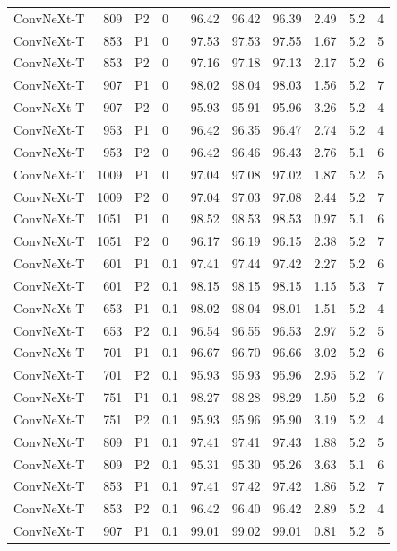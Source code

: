 {\begin{longtable}{lrllrrrrrr}
ConvNeXt-T & 809 & P2 & 0 & 96.42 & 96.42 & 96.39 & 2.49 & 5.2 & 4 \\
ConvNeXt-T & 853 & P1 & 0 & 97.53 & 97.53 & 97.55 & 1.67 & 5.2 & 5 \\
ConvNeXt-T & 853 & P2 & 0 & 97.16 & 97.18 & 97.13 & 2.17 & 5.2 & 6 \\
ConvNeXt-T & 907 & P1 & 0 & 98.02 & 98.04 & 98.03 & 1.56 & 5.2 & 7 \\
ConvNeXt-T & 907 & P2 & 0 & 95.93 & 95.91 & 95.96 & 3.26 & 5.2 & 4 \\
ConvNeXt-T & 953 & P1 & 0 & 96.42 & 96.35 & 96.47 & 2.74 & 5.2 & 4 \\
ConvNeXt-T & 953 & P2 & 0 & 96.42 & 96.46 & 96.43 & 2.76 & 5.1 & 6 \\
ConvNeXt-T & 1009 & P1 & 0 & 97.04 & 97.08 & 97.02 & 1.87 & 5.2 & 5 \\
ConvNeXt-T & 1009 & P2 & 0 & 97.04 & 97.03 & 97.08 & 2.44 & 5.2 & 7 \\
ConvNeXt-T & 1051 & P1 & 0 & 98.52 & 98.53 & 98.53 & 0.97 & 5.1 & 6 \\
ConvNeXt-T & 1051 & P2 & 0 & 96.17 & 96.19 & 96.15 & 2.38 & 5.2 & 7 \\
ConvNeXt-T & 601 & P1 & 0.1 & 97.41 & 97.44 & 97.42 & 2.27 & 5.2 & 6 \\
ConvNeXt-T & 601 & P2 & 0.1 & 98.15 & 98.15 & 98.15 & 1.15 & 5.3 & 7 \\
ConvNeXt-T & 653 & P1 & 0.1 & 98.02 & 98.04 & 98.01 & 1.51 & 5.2 & 4 \\
ConvNeXt-T & 653 & P2 & 0.1 & 96.54 & 96.55 & 96.53 & 2.97 & 5.2 & 5 \\
ConvNeXt-T & 701 & P1 & 0.1 & 96.67 & 96.70 & 96.66 & 3.02 & 5.2 & 6 \\
ConvNeXt-T & 701 & P2 & 0.1 & 95.93 & 95.93 & 95.96 & 2.95 & 5.2 & 7 \\
ConvNeXt-T & 751 & P1 & 0.1 & 98.27 & 98.28 & 98.29 & 1.50 & 5.2 & 6 \\
ConvNeXt-T & 751 & P2 & 0.1 & 95.93 & 95.96 & 95.90 & 3.19 & 5.2 & 4 \\
ConvNeXt-T & 809 & P1 & 0.1 & 97.41 & 97.41 & 97.43 & 1.88 & 5.2 & 5 \\
ConvNeXt-T & 809 & P2 & 0.1 & 95.31 & 95.30 & 95.26 & 3.63 & 5.1 & 6 \\
ConvNeXt-T & 853 & P1 & 0.1 & 97.41 & 97.42 & 97.42 & 1.86 & 5.2 & 7 \\
ConvNeXt-T & 853 & P2 & 0.1 & 96.42 & 96.40 & 96.42 & 2.89 & 5.2 & 4 \\
ConvNeXt-T & 907 & P1 & 0.1 & 99.01 & 99.02 & 99.01 & 0.81 & 5.2 & 5 \\

\end{longtable}}
